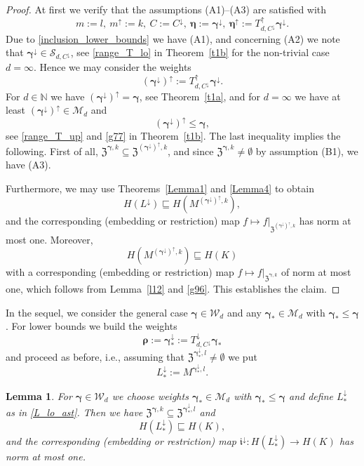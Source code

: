 \documentclass{article}
\newcommand{\N}  {{\mathbb N}}
\newcommand{\bg}{{\boldsymbol{\gamma}}}
\newcommand{\br}{{\boldsymbol{\rho}}}
\newcommand{\be}{{\boldsymbol{\eta}}}
\newcommand{\Z}{{\mathfrak Z}}
\newcommand{\W}  {\mathcal{W}}
\newcommand{\M}  {\mathcal{M}}
\newcommand{\SSS}{\mathcal{S}}
\newcommand{\lo}{\downarrow}
\newcommand{\up}{\uparrow}
\theoremstyle{plain}
\newtheorem{lemma}{Lemma}
\theoremstyle{definition}
\begin{document}
\begin{proof}
At first we verify that the assumptions (A1)--(A3)
are satisfied with
\[
m := l,\ m^\up := k,\ C := C^\lo,\ \be := \bg^\lo,\ 
\be^\up := T^\up_{d,C^\lo} \bg^\lo.
\]
Due to \eqref{inclusion_lower_bounds} we have (A1), and 
concerning (A2) we note that
$\bg^\lo \in \SSS_{d,C^\lo}$, see 
\eqref{range_T_lo} in Theorem~\ref{t1b} for the non-trivial
case $d=\infty$. Hence we may consider the weights
\[
(\bg^{\lo})^{\up}:= T^{\up}_{d,C^\lo} \bg^{\lo} .
\]
For $d \in \N$ we have $(\bg^{\lo})^{\up} = \bg$, see
Theorem~\ref{t1a}, and for $d = \infty$ we have at least
$(\bg^{\lo})^{\up} \in \M_d$ 
and 
\begin{equation}\label{g96}
(\bg^{\lo})^{\up} \le \bg,
\end{equation}
see 
\eqref{range_T_up} and \eqref{g77} in Theorem~\ref{t1b}. 
The last inequality implies the following. First of all,
$\Z^{\bg,k} \subseteq \Z^{(\bg^{\lo})^{\up},k}$, and since
$\Z^{\bg,k} \neq \emptyset$ by assumption (B1), we have (A3).

Furthermore, we may use Theorems~\ref{Lemma1} and \ref{Lemma4} to
obtain 
\[
H(L^{\lo}) \sqsubseteq H\left(M^{(\bg^{\lo})^{\up},k}\right),
\]
and the corresponding (embedding or restriction) map
$f \mapsto f|_{\Z^{(\bg^{\lo})^{\up},k}}$ has norm at most one.
Moreover,
\[
H\left(M^{(\bg^{\lo})^{\up},k}\right)  \sqsubseteq H(K)
\]
with a corresponding (embedding or restriction) map
$f \mapsto f|_{\Z^{\bg,k}}$ of norm at most one, which follows from
Lemma~\ref{l12} and \eqref{g96}.
This establishes the claim.
\end{proof}

In the sequel, we consider the general case $\bg \in \W_d$ and 
any $\bg_\ast \in \M_{d}$ with $\bg_\ast \leq \bg$. 
For lower bounds we build the weights 
\[
\br := \bg^{\lo}_\ast := T^{\lo}_{d,C^\lo} \bg_\ast
\]
and proceed as before, i.e.,
assuming that $\Z^{\bg^\lo_\ast,l} \neq \emptyset$ we put
\begin{equation}\label{L_lo_ast}
L^\lo_\ast := M^{\bg^\lo_\ast,l}.
\end{equation}

\begin{lemma}\label{l24}
For $\bg \in \W_d$ 
we choose weights $\bg_\ast \in \M_{d}$ with 
$\bg_\ast \leq \bg$
and define $L^\lo_\ast$ as in \eqref{L_lo_ast}.
Then we have $\Z^{\bg,k} \subseteq \Z^{\bg^\lo_\ast,l}$ and
\[
H(L^{\lo}_\ast) \sqsubseteq H(K), 
\]
and the corresponding (embedding or restriction) map
$\mathfrak{i}^\lo \colon H(L^\lo_\ast) \to H(K)$
has norm at most one.
\end{lemma}
\end{document}
